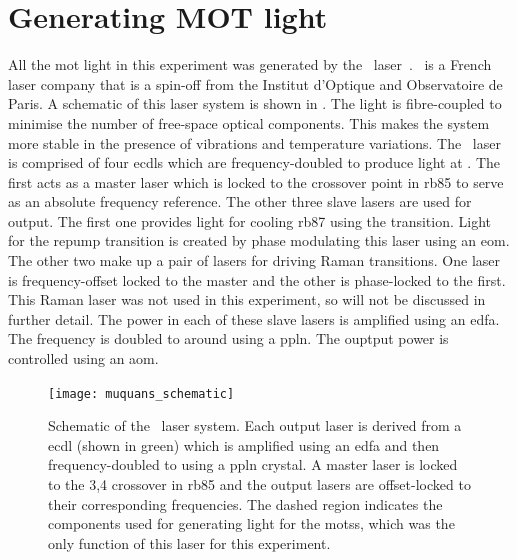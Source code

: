 \section{Generating MOT light}\label{sec:muquans_light}
 All the \ac{mot} light in this experiment was generated by the \Muquans\
laser~\cite{muquansWebPage}. \Muquans\ is a French laser company that is a
spin-off from the Institut d'Optique and Observatoire de Paris. A schematic of
this laser system is shown in \FigureRef{fig:muquans_schematic}. The
light is fibre-coupled to minimise the number of free-space optical components.
This makes the system more stable in the presence of vibrations and
temperature variations. The \Muquans\ laser is comprised of four
\sivalue{1560}{\nano\metre} \acp{ecdl} which are frequency-doubled to produce
light at \sivalue{780}{\nano\metre}. The first acts as a master laser
which is locked to the \trans{3}{3,4} crossover point in
\ac{rb85} to serve as an absolute frequency reference. The other three slave
lasers are used for output. The first one provides light for cooling \ac{rb87} using the  transition.
Light for the \trans{1}{2} repump transition is created by phase modulating this laser using an \ac{eom}.
The other two make up a pair of lasers for driving Raman transitions. One laser
is frequency-offset locked to the master and the other is phase-locked to the
first. This Raman laser was not used in this experiment, so will
not be discussed in further detail. The power in each of these slave lasers is amplified using
an \ac{edfa}. The frequency is doubled to around \sivalue{780}{\nano\metre} using a \ac{ppln}. The ouptput power is controlled using an
\ac{aom}.
\begin{figure}[!htbp]
	\texttt{[image: muquans\_schematic]}
	\caption[\Muquans\ Laser System Diagram]{Schematic of the \Muquans\ laser system. Each output laser is derived from a \acs{ecdl} (shown in green) which is amplified using an \acs{edfa} and then frequency-doubled to  using a \acs{ppln} crystal. A master laser is locked to the 3,4 crossover in \ac{rb85} and the output lasers are offset-locked to their corresponding frequencies. The dashed region indicates the components used for generating light for the \acp{mots}, which was the only function of this laser for this experiment.}\label{fig:muquans_schematic}
\end{figure}
